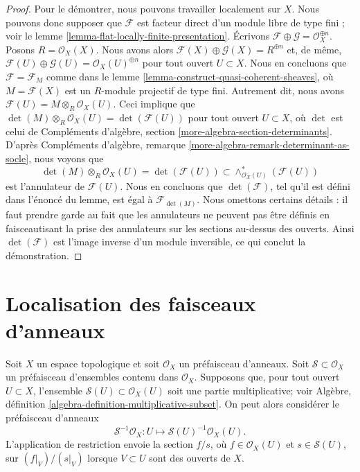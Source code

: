 \begin{proof}
Pour le démontrer, nous pouvons travailler localement sur $X$. Nous pouvons donc supposer que $\mathcal{F}$
est facteur direct d'un module libre de type fini ; voir le
lemme \ref{lemma-flat-locally-finite-presentation}. Écrivons
$\mathcal{F} \oplus \mathcal{G} = \mathcal{O}_X^{\oplus n}$.
Posons $R = \mathcal{O}_X(X)$. Nous avons alors
$\mathcal{F}(X) \oplus \mathcal{G}(X) = R^{\oplus n}$
et, de même,
$\mathcal{F}(U) \oplus \mathcal{G}(U) = \mathcal{O}_X(U)^{\oplus n}$
pour tout ouvert $U \subset X$.
Nous en concluons que $\mathcal{F} = \mathcal{F}_M$ comme dans le
lemme \ref{lemma-construct-quasi-coherent-sheaves},
où $M = \mathcal{F}(X)$ est un $R$-module projectif de type fini.
Autrement dit, nous avons $\mathcal{F}(U) = M \otimes_R \mathcal{O}_X(U)$.
Ceci implique que
$\det(M) \otimes_R \mathcal{O}_X(U) = \det(\mathcal{F}(U))$
pour tout ouvert $U \subset X$, où $\det$ est celui de
Compléments d'algèbre, section \ref{more-algebra-section-determinants}. D'après
Compléments d'algèbre, remarque \ref{more-algebra-remark-determinant-as-socle},
nous voyons que
$$
\det(M) \otimes_R \mathcal{O}_X(U) =
\det(\mathcal{F}(U)) \subset
\wedge^*_{\mathcal{O}_X(U)}(\mathcal{F}(U))
$$
est l'annulateur de $\mathcal{F}(U)$. Nous en concluons que
$\det(\mathcal{F})$, tel qu'il est défini dans l'énoncé du lemme,
est égal à $\mathcal{F}_{\det(M)}$. Nous omettons certains détails : il faut
prendre garde au fait que les annulateurs ne peuvent pas être définis en faisceautisant
la prise des annulateurs sur les sections au-dessus des ouverts. Ainsi $\det(\mathcal{F})$
est l'image inverse d'un module inversible, ce qui conclut la démonstration.
\end{proof}
\section{Localisation des faisceaux d'anneaux}
\label{section-localizing-sheaves-rings}

\noindent
Soit $X$ un espace topologique et soit $\mathcal{O}_X$ un
préfaisceau d'anneaux. Soit $\mathcal{S} \subset \mathcal{O}_X$
un préfaisceau d'ensembles contenu dans $\mathcal{O}_X$.
Supposons que, pour tout ouvert $U \subset X$, l'ensemble
$\mathcal{S}(U) \subset \mathcal{O}_X(U)$ soit une partie multiplicative;
voir Algèbre, définition \ref{algebra-definition-multiplicative-subset}.
On peut alors considérer le préfaisceau d'anneaux
$$
\mathcal{S}^{-1}\mathcal{O}_X :
U \longmapsto \mathcal{S}(U)^{-1}\mathcal{O}_X(U).
$$
L'application de restriction envoie la section $f/s$, où
$f \in \mathcal{O}_X(U)$ et $s \in \mathcal{S}(U)$, sur
$(f|_V)/(s|_V)$ lorsque $V \subset U$ sont des ouverts de $X$.


